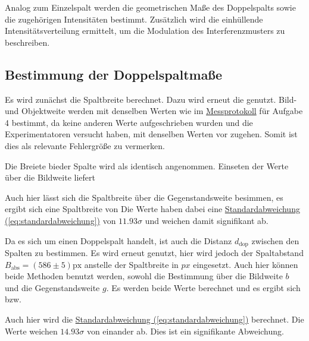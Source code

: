 Analog zum Einzelspalt werden die geometrischen Maße des Doppelspalts sowie die zugehörigen Intensitäten bestimmt. Zusätzlich wird die einhüllende Intensitätsverteilung ermittelt, um die Modulation des Interferenzmusters zu beschreiben.

\subsection{Bestimmung der Doppelspaltmaße} \label{sec:A3_1}
Es wird zunächst die Spaltbreite berechnet. Dazu wird erneut die  genutzt. Bild- und Objektweite werden mit denselben Werten wie im \hyperref[ch:Protokoll]{Messprotokoll} für Aufgabe 4 bestimmt, da keine anderen Werte aufgeschrieben wurden und die Experimentatoren versucht haben, mit denselben Werten vor zugehen. Somit ist dies als relevante Fehlergröße zu vermerken.

Die Breiete bieder Spalte wird als identisch angenommen. Einseten der Werte über die Bildweite liefert

Auch hier lässt sich die Spaltbreite über die Gegenstandsweite besimmen, es ergibt sich eine Spaltbreite von
Die Werte haben dabei eine \hyperref[eq:standardabweichung]{Standardabweichung (\ref*{eq:standardabweichung})} von $11.93\sigma$ und weichen damit signifikant ab.

Da es sich um einen Doppelspalt handelt, ist auch die Distanz $d_\text{dop}$ zwischen den Spalten zu bestimmen. Es wird erneut  genutzt, hier wird jedoch der Spaltabstand $B_\text{abs} = (586 \pm 5) \mathrm{px}$ anstelle der Spaltbreite in $px$ eingesetzt. Auch hier können beide Methoden benutzt werden, sowohl die Bestimmung über die Bildweite $b$ und die Gegenstandsweite $g$. Es werden beide Werte berechnet und es ergibt sich
bzw.

Auch hier wird die \hyperref[eq:standardabweichung]{Standardabweichung (\ref*{eq:standardabweichung})} berechnet. Die Werte weichen $14.93\sigma$ von einander ab. Dies ist ein signifikante Abweichung.

